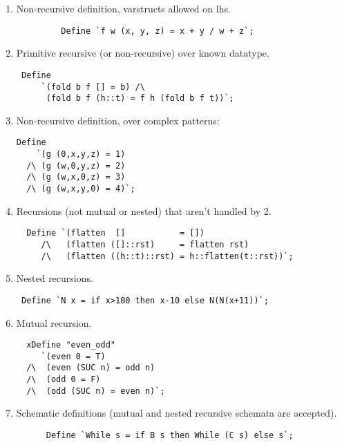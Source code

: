 \begin{enumerate}

\item Non-recursive definition, varstructs allowed on lhs.
\begin{verbatim}
         Define `f w (x, y, z) = x + y / w + z`;
\end{verbatim}

\item Primitive recursive (or non-recursive) over known datatype.

\begin{verbatim}
 Define
     `(fold b f [] = b) /\
      (fold b f (h::t) = f h (fold b f t))`;

\end{verbatim}

\item Non-recursive definition, over complex patterns:

\begin{verbatim}
Define
    `(g (0,x,y,z) = 1)
  /\ (g (w,0,y,z) = 2)
  /\ (g (w,x,0,z) = 3)
  /\ (g (w,x,y,0) = 4)`;
\end{verbatim}

\item Recursions (not mutual or nested) that aren't handled by 2.

\begin{verbatim}
  Define `(flatten  []           = [])
     /\   (flatten ([]::rst)     = flatten rst)
     /\   (flatten ((h::t)::rst) = h::flatten(t::rst))`;
\end{verbatim}

\item Nested recursions.
\begin{verbatim}
 Define `N x = if x>100 then x-10 else N(N(x+11))`;
\end{verbatim}

\item Mutual recursion.
\begin{verbatim}
  xDefine "even_odd"
     `(even 0 = T)
  /\  (even (SUC n) = odd n)
  /\  (odd 0 = F)
  /\  (odd (SUC n) = even n)`;
\end{verbatim}

\item Schematic definitions (mutual and nested recursive schemata are
         accepted).
\begin{verbatim}
      Define `While s = if B s then While (C s) else s`;
\end{verbatim}
\end{enumerate}

